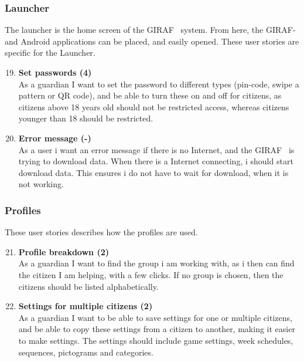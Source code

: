 \subsubsection{Launcher}
The launcher is the home screen of the GIRAF~ system. From here, the GIRAF- and Android applications can be placed, and easily opened. These user stories are specific for the Launcher.

\begin{enumerate}
	\setcounter{enumi}{18} %
	\item \textbf{Set passwords (4)} \\
	As a guardian I want to set the password to different types (pin-code, swipe a pattern or QR code), and be able to turn these on and off for citizens, as citizens above 18 years old should not be restricted access, whereas citizens younger than 18 should be restricted. 
	
	\item \textbf{Error message (-)}\\
	As a user i want an error message if there is no Internet, and the GIRAF~ is trying to download data. When there is a Internet connecting, i should start download data. This ensures i do not have to wait for download, when it is not working.
\end{enumerate}

\subsubsection{Profiles}
These user stories describes how the profiles are used. 

\begin{enumerate}
	\setcounter{enumi}{20} %
	\item \textbf{Profile breakdown (2) }\\
	As a guardian I want to find the group i am working with, as i then can find the citizen I am helping, with a few clicks. If no group is chosen, then the citizens should be listed alphabetically. 
	
	\item \textbf{Settings for multiple citizens (2)}\\
	As a guardian I want to be able to save settings for one or multiple citizens, and be able to copy these settings from a citizen to another, making it easier to make settings. The settings should include game settings, week schedules, sequences, pictograms and categories.
\end{enumerate}

